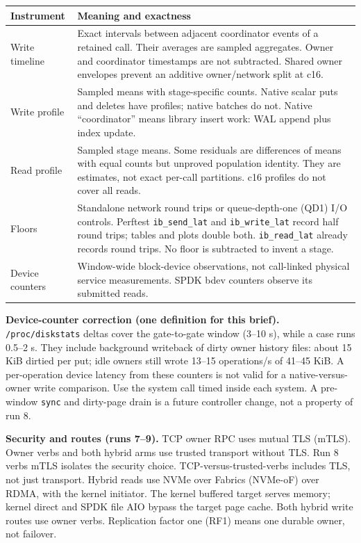 \documentclass[10pt,a4paper]{article}
\begin{document}
\begin{center}\small
\begin{tabular}{lp{.67\linewidth}}\toprule
Instrument & Meaning and exactness\\\midrule
Write timeline & Exact intervals between adjacent coordinator events of a retained call. Their averages are sampled aggregates. Owner and coordinator timestamps are not subtracted. Shared owner envelopes prevent an additive owner/network split at c16.\\
Write profile & Sampled means with stage-specific counts. Native scalar puts and deletes have profiles; native batches do not. Native ``coordinator'' means library insert work: WAL append plus index update.\\
Read profile & Sampled stage means. Some residuals are differences of means with equal counts but unproved population identity. They are estimates, not exact per-call partitions. c16 profiles do not cover all reads.\\
Floors & Standalone network round trips or queue-depth-one (QD1) I/O controls. Perftest \texttt{ib\_send\_lat} and \texttt{ib\_write\_lat} record half round trips; tables and plots double both. \texttt{ib\_read\_lat} already records round trips. No floor is subtracted to invent a stage.\\
Device counters & Window-wide block-device observations, not call-linked physical service measurements. SPDK bdev counters observe its submitted reads.\\\bottomrule
\end{tabular}
\end{center}
\textbf{Device-counter correction (one definition for this brief).} \texttt{/proc/diskstats} deltas cover the gate-to-gate window (3--10 s), while a case runs 0.5--2 s. They include background writeback of dirty owner history files: about 15 KiB dirtied per put; idle owners still wrote 13--15 operations/s of 41--45 KiB. A per-operation device latency from these counters is not valid for a native-versus-owner write comparison. Use the system call timed inside each system. A pre-window \texttt{sync} and dirty-page drain is a future controller change, not a property of run 8.

\textbf{Security and routes (runs 7--9).} TCP owner RPC uses mutual TLS (mTLS). Owner verbs and both hybrid arms use trusted transport without TLS. Run 8 verbs mTLS isolates the security choice. TCP-versus-trusted-verbs includes TLS, not just transport. Hybrid reads use NVMe over Fabrics (NVMe-oF) over RDMA, with the kernel initiator. The kernel buffered target serves memory; kernel direct and SPDK file AIO bypass the target page cache. Both hybrid write routes use owner verbs. Replication factor one (RF1) means one durable owner, not failover.
\end{document}
